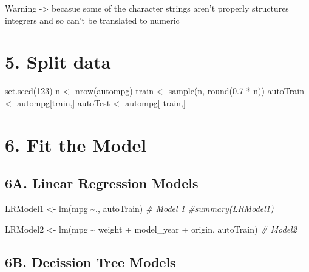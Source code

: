 \documentclass[
]{article}
\newenvironment{Shaded}{\begin{snugshade}}{\end{snugshade}}
\newcommand{\CommentTok}[1]{\textcolor[rgb]{0.56,0.35,0.01}{\textit{#1}}}
\newcommand{\DecValTok}[1]{\textcolor[rgb]{0.00,0.00,0.81}{#1}}
\newcommand{\FloatTok}[1]{\textcolor[rgb]{0.00,0.00,0.81}{#1}}
\newcommand{\FunctionTok}[1]{\textcolor[rgb]{0.00,0.00,0.00}{#1}}
\newcommand{\NormalTok}[1]{#1}
\newcommand{\OtherTok}[1]{\textcolor[rgb]{0.56,0.35,0.01}{#1}}
\newcommand{\SpecialCharTok}[1]{\textcolor[rgb]{0.00,0.00,0.00}{#1}}
\begin{document}
Warning -\textgreater{} becasue some of the character strings aren't
properly structures integrers and so can't be translated to numeric

\hypertarget{split-data}{%
\section{5. Split data}\label{split-data}}

\begin{Shaded}
\begin{Highlighting}[]
\FunctionTok{set.seed}\NormalTok{(}\DecValTok{123}\NormalTok{)}
\NormalTok{n }\OtherTok{\textless{}{-}} \FunctionTok{nrow}\NormalTok{(autompg)}
\NormalTok{train }\OtherTok{\textless{}{-}} \FunctionTok{sample}\NormalTok{(n, }\FunctionTok{round}\NormalTok{(}\FloatTok{0.7} \SpecialCharTok{*}\NormalTok{ n))}
\NormalTok{autoTrain }\OtherTok{\textless{}{-}}\NormalTok{ autompg[train,]}
\NormalTok{autoTest }\OtherTok{\textless{}{-}}\NormalTok{ autompg[}\SpecialCharTok{{-}}\NormalTok{train,]}
\end{Highlighting}
\end{Shaded}

\hypertarget{fit-the-model}{%
\section{6. Fit the Model}\label{fit-the-model}}

\hypertarget{a.-linear-regression-models}{%
\subsection{6A. Linear Regression
Models}\label{a.-linear-regression-models}}

\begin{Shaded}
\begin{Highlighting}[]
\NormalTok{LRModel1 }\OtherTok{\textless{}{-}} \FunctionTok{lm}\NormalTok{(mpg }\SpecialCharTok{\textasciitilde{}}\NormalTok{., autoTrain) }\CommentTok{\# Model 1}
\CommentTok{\#summary(LRModel1)}

\NormalTok{LRModel2 }\OtherTok{\textless{}{-}} \FunctionTok{lm}\NormalTok{(mpg }\SpecialCharTok{\textasciitilde{}}\NormalTok{ weight }\SpecialCharTok{+}\NormalTok{ model\_year }\SpecialCharTok{+}\NormalTok{ origin, autoTrain) }\CommentTok{\# Model2}
\end{Highlighting}
\end{Shaded}

\hypertarget{b.-decission-tree-models}{%
\subsection{6B. Decission Tree Models}\label{b.-decission-tree-models}}
\end{document}

